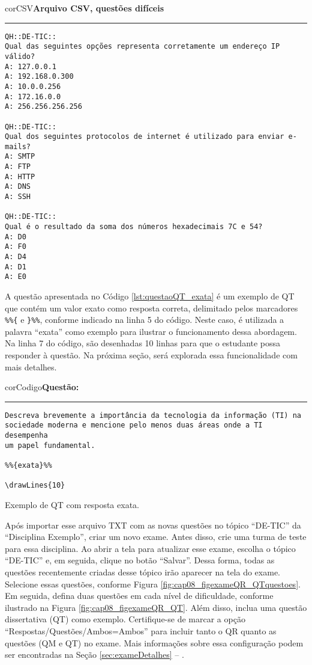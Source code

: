 \begin{myboxCode}{corCSV}{\textbf{Arquivo CSV, questões difíceis}}\vspace{3mm}
\hrule
{\footnotesize
\begin{verbatim}
QH::DE-TIC:: 
Qual das seguintes opções representa corretamente um endereço IP válido?
A: 127.0.0.1
A: 192.168.0.300
A: 10.0.0.256
A: 172.16.0.0
A: 256.256.256.256

QH::DE-TIC::
Qual dos seguintes protocolos de internet é utilizado para enviar e-mails?
A: SMTP
A: FTP
A: HTTP
A: DNS
A: SSH

QH::DE-TIC::
Qual é o resultado da soma dos números hexadecimais 7C e 54?
A: D0
A: F0
A: D4
A: D1
A: E0
\end{verbatim}
}
\end{myboxCode}

A questão apresentada no Código \ref{lst:questaoQT_exata} é um exemplo de QT que contém um valor exato como resposta correta, delimitado pelos marcadores \verb|%%{| e \verb|}%%|, conforme indicado na linha 5 do código. Neste caso, é utilizada a palavra ``exata'' como exemplo para ilustrar o funcionamento dessa abordagem. Na linha 7 do código, são desenhadas 10 linhas para que o estudante possa responder à questão. Na próxima seção, será explorada essa funcionalidade com mais detalhes.

\begin{listing}[!ht]
\begin{myboxCode}{corCodigo}{\textbf{Questão: }}\vspace{3mm}
\hrule
\begin{verbatim}
Descreva brevemente a importância da tecnologia da informação (TI) na 
sociedade moderna e mencione pelo menos duas áreas onde a TI desempenha 
um papel fundamental.

%%{exata}%%

\drawLines{10}
\end{verbatim}
\end{myboxCode}
\caption{Exemplo de QT com resposta exata.}
\label{lst:questaoQT_exata}
\end{listing}

Após importar esse arquivo TXT com as novas questões no tópico ``DE-TIC'' da ``Disciplina Exemplo'', criar um novo exame. Antes disso, crie uma turma de teste para essa disciplina. Ao abrir a tela para atualizar esse exame, escolha o tópico ``DE-TIC'' e, em seguida, clique no botão ``Salvar''. Dessa forma, todas as questões recentemente criadas desse tópico irão aparecer na tela do exame. Selecione essas questões, conforme Figura \ref{fig:cap08_figexameQR_QTquestoes}. Em seguida, defina duas questões em cada nível de dificuldade, conforme ilustrado na Figura \ref{fig:cap08_figexameQR_QT}. Além disso, inclua uma questão dissertativa (QT) como exemplo. Certifique-se de marcar a opção ``Respostas/Questões/Ambos=Ambos'' para incluir tanto o QR quanto as questões (QM e QT) no exame. Mais informações sobre essa configuração podem ser encontradas na Seção \ref{sec:exameDetalhes} -- .

